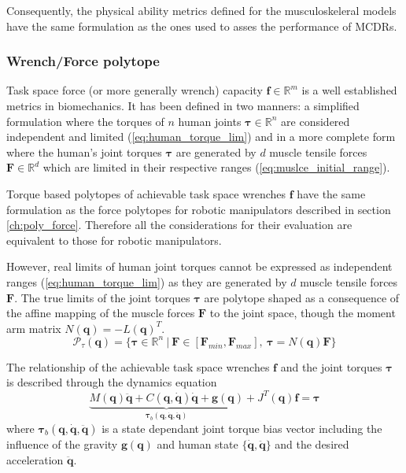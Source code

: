 Consequently, the physical ability metrics defined for the musculoskeleral models have the same formulation as the ones used to asses the performance of MCDRs.

\subsubsection{Wrench/Force polytope}
\label{ch:force_poly_human}
Task space force (or more generally wrench) capacity $\bm{f} \in \mathbb{R}^m$ is a well established metrics in biomechanics. It has been defined in two manners: a simplified formulation where the torques of $n$ human joints $\bm{\tau} \in \mathbb{R}^n$ are considered independent and limited (\ref{eq:human_torque_lim}) and in a more complete form where the human's joint torques $\bm{\tau}$ are generated by $d$ muscle tensile forces $\bm{F} \in \mathbb{R}^d$ which are limited in their respective ranges (\ref{eq:muslce_initial_range}).

Torque based polytopes \cite{rezzoug_application_2012,sasaki2011vertex} of achievable task space wrenches $\bm{f}$ have the same formulation as the force polytopes for robotic manipulators described in section \ref{ch:poly_force}. Therefore all the considerations for their evaluation are equivalent to those for robotic manipulators.  

However, real limits of human joint torques cannot be expressed as independent ranges (\ref{eq:human_torque_lim}) as they are generated by $d$ muscle tensile forces $\bm{F}$. The true limits of the joint torques $\bm{\tau}$ are polytope shaped as a consequence of the affine mapping of the muscle forces $\bm{F}$ to the joint space, though the moment arm matrix $N(\bm{q})=-L(\bm{q})^T$.
\begin{equation}
\mathcal{P}_\tau(\bm{q}) = \{\bm{\tau} \in \mathbb{R}^n ~|~\bm{F}\in [\bm{F}_{min}, \bm{F}_{max}], ~\bm{\tau}=N(\bm{q})\bm{F}\}
\label{eq:poly_torque_human}
\end{equation}

The relationship of the achievable task space wrenches $\bm{f}$ and the joint torques $\bm{\tau}$ is described through the dynamics equation 
\begin{equation}
\underbrace{M(\bm{q})\ddot{\bm{q}} + C(\bm{q},\dot{\bm{q}})\dot{\bm{q}} + \bm{g}(\bm{q})}_{\bm{\tau}_b(\bm{q},\dot{\bm{q}},\ddot{\bm{q}})} + J^T(\bm{q})\bm{f} = \bm{\tau} 
\end{equation}
where $\bm{\tau}_b(\bm{q},\dot{\bm{q}},\ddot{\bm{q}})$ is a state dependant joint torque bias vector including the influence of the gravity $\bm{g}(\bm{q})$ and human state $\{\dot{\bm{q}},\ddot{\bm{q}}\}$ and the desired acceleration $\ddot{\bm{q}}$. 


